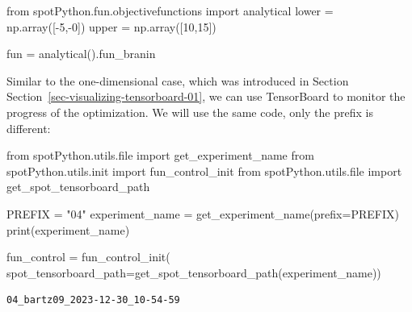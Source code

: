 \documentclass[
  letterpaper,
  DIV=11,
  numbers=noendperiod]{scrreprt}
\newenvironment{Shaded}{\begin{snugshade}}{\end{snugshade}}
\newcommand{\BuiltInTok}[1]{\textcolor[rgb]{0.00,0.23,0.31}{#1}}
\newcommand{\DecValTok}[1]{\textcolor[rgb]{0.68,0.00,0.00}{#1}}
\newcommand{\ImportTok}[1]{\textcolor[rgb]{0.00,0.46,0.62}{#1}}
\newcommand{\NormalTok}[1]{\textcolor[rgb]{0.00,0.23,0.31}{#1}}
\newcommand{\OperatorTok}[1]{\textcolor[rgb]{0.37,0.37,0.37}{#1}}
\newcommand{\StringTok}[1]{\textcolor[rgb]{0.13,0.47,0.30}{#1}}
\begin{document}
\begin{Shaded}
\begin{Highlighting}[]
\ImportTok{from}\NormalTok{ spotPython.fun.objectivefunctions }\ImportTok{import}\NormalTok{ analytical}
\NormalTok{lower }\OperatorTok{=}\NormalTok{ np.array([}\OperatorTok{{-}}\DecValTok{5}\NormalTok{,}\OperatorTok{{-}}\DecValTok{0}\NormalTok{])}
\NormalTok{upper }\OperatorTok{=}\NormalTok{ np.array([}\DecValTok{10}\NormalTok{,}\DecValTok{15}\NormalTok{])}
\end{Highlighting}
\end{Shaded}

\begin{Shaded}
\begin{Highlighting}[]
\NormalTok{fun }\OperatorTok{=}\NormalTok{ analytical().fun\_branin}
\end{Highlighting}
\end{Shaded}

\begin{tcolorbox}[enhanced jigsaw, arc=.35mm, colback=white, bottomtitle=1mm, toprule=.15mm, coltitle=black, titlerule=0mm, leftrule=.75mm, title=\textcolor{quarto-callout-note-color}{\faInfo}\hspace{0.5em}{TensorBoard}, opacitybacktitle=0.6, breakable, colbacktitle=quarto-callout-note-color!10!white, opacityback=0, toptitle=1mm, rightrule=.15mm, left=2mm, colframe=quarto-callout-note-color-frame, bottomrule=.15mm]

Similar to the one-dimensional case, which was introduced in Section
Section~\ref{sec-visualizing-tensorboard-01}, we can use TensorBoard to
monitor the progress of the optimization. We will use the same code,
only the prefix is different:

\begin{Shaded}
\begin{Highlighting}[]
\ImportTok{from}\NormalTok{ spotPython.utils.}\BuiltInTok{file} \ImportTok{import}\NormalTok{ get\_experiment\_name}
\ImportTok{from}\NormalTok{ spotPython.utils.init }\ImportTok{import}\NormalTok{ fun\_control\_init}
\ImportTok{from}\NormalTok{ spotPython.utils.}\BuiltInTok{file} \ImportTok{import}\NormalTok{ get\_spot\_tensorboard\_path}

\NormalTok{PREFIX }\OperatorTok{=} \StringTok{"04"}
\NormalTok{experiment\_name }\OperatorTok{=}\NormalTok{ get\_experiment\_name(prefix}\OperatorTok{=}\NormalTok{PREFIX)}
\BuiltInTok{print}\NormalTok{(experiment\_name)}

\NormalTok{fun\_control }\OperatorTok{=}\NormalTok{ fun\_control\_init(}
\NormalTok{    spot\_tensorboard\_path}\OperatorTok{=}\NormalTok{get\_spot\_tensorboard\_path(experiment\_name))}
\end{Highlighting}
\end{Shaded}

\begin{verbatim}
04_bartz09_2023-12-30_10-54-59
\end{verbatim}

\end{tcolorbox}
\end{document}
